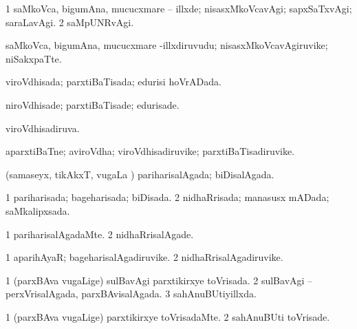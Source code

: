 {{\bentry
{} 
\gl{\kirxvi}
\expl{}
\bmng
\bnum
\num{1} saMkoVca, bigumAna, mucucxmare -- illxde; nisasxMkoVcavAgi; sapxSaTxvAgi; saraLavAgi. 
\num{2} saMpUNRvAgi. 
\enum
\emng
\eentry

\bentry
{} 
\gl{\nA}
\expl{}
\bmng
saMkoVca, bigumAna, mucucxmare -illxdiruvudu; nisasxMkoVcavAgiruvike; niSakxpaTte. 
\emng
\eentry

\bentry
{} 
\gl{\gu}
\expl{}
\bmng
viroVdhisada; parxtiBaTisada; edurisi hoVrADada. 
\emng
\eentry

\bentry
{} 
\gl{\kirxvi}
\expl{}
\bmng
niroVdhisade; parxtiBaTisade; edurisade. 
\emng
\eentry

\bentry
{} 
\gl{\gu}
\expl{}
\bmng
viroVdhisadiruva. 
\emng
\eentry

\bentry
{} 
\gl{\kirxvi}
\expl{}
\bmng
{} 
\emng
\eentry

\bentry 
{} 
\gl{\nA}
\expl{}
\bmng
aparxtiBaTne; aviroVdha; viroVdhisadiruvike; parxtiBaTisadiruvike. 
\emng
\eentry

\bentry
{} 
\gl{\gu}
\expl{}
\bmng
(samaseyx, tikAkxT, \mo vugaLa \vi) pariharisalAgada; biDisalAgada. 
\emng
\eentry

\bentry
{} 
\gl{\gu}
\expl{}
\bmng
\bnum
\num{1} pariharisada; bageharisada; biDisada. 
\num{2} nidhaRrisada; manasusx mADada; saMkalipxsada. 
\enum
\emng
\eentry

\bentry
{} 
\gl{\kirxvi}
\expl{}
\bmng
\bnum
\num{1} pariharisalAgadaMte. 
\num{2} nidhaRrisalAgade. 
\enum
\emng
\eentry

\bentry
{} 
\gl{\nA}
\expl{}
\bmng
\bnum
\num{1} aparihAyaR; bageharisalAgadiruvike. 
\num{2} nidhaRrisalAgadiruvike. 
\enum
\emng
\eentry

\bentry
{} 
\gl{\gu}
\expl{}
\bmng
\bnum
\num{1} (parxBAva \mo vugaLige) sulBavAgi parxtikirxye toVrisada. 
\num{2} sulBavAgi -- perxVrisalAgada, parxBAvisalAgada. 
\num{3} sahAnuBUtiyillxda. 
\enum
\emng
\eentry

\bentry
{} 
\gl{\kirxvi}
\expl{}
\bmng
\bnum
\num{1} (parxBAva \mo vugaLige) parxtikirxye toVrisadaMte. 
\num{2} sahAnuBUti toVrisade. 
\enum
\emng
\eentry

}}
